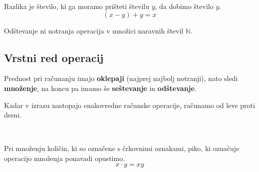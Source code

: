 \begin{figure}[H]
                
    \end{figure}
 

      
        Razlika je število, ki ga moramo prišteti številu $y$, da dobimo število $y$.
        $$ (x-y)+y=x $$


        Odštevanje ni notranja operacija v množici naravnih števil $\mathbb{N}$.
     

     \subsection{Vrstni red operacij}
        Prednost pri računanju imajo \textbf{oklepaji} (najprej najbolj notranji), nato sledi \textbf{množenje},
        na koncu pa imamo še \textbf{seštevanje} in \textbf{odštevanje}.
     

      
        Kadar v izrazu nastopajo enakovredne računske operacije, računamo od leve proti desni.
     

        ~\newline

        Pri množenju količin, ki so označene s črkovnimi oznakami, piko, ki označuje operacijo množenja ponavadi opustimo.
        $$ x\cdot y = xy$$
     


